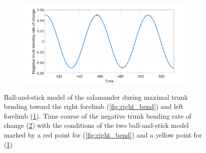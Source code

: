 \documentclass[a4paper]{scrartcl}
\begin{document}
{\begin{figure}
\begin{subfigure}[b]{0.45\linewidth}
  \caption{\label{fig:left_bend}}
 \end{subfigure}
 \begin{subfigure}[b]{\linewidth}
  \centering
  \includegraphics[width=\textwidth]{Figures/figure2Bc.png}
  \caption{\label{fig:rate_bend}}
 \end{subfigure}
 \caption{\label{fig:trunk_bending} Ball-and-stick model of the salamander during maximal trunk bending toward the right forelimb (\ref{fig:right_bend}) and left forelimb (\ref{fig:left_bend}). Time course of the negative trunk bending rate of change (\ref{fig:rate_bend}) with the conditions of the two ball-and-stick model marked by a red point for (\ref{fig:right_bend}) and a yellow point for (\ref{fig:left_bend})}
\end{figure}

}
\end{document}
